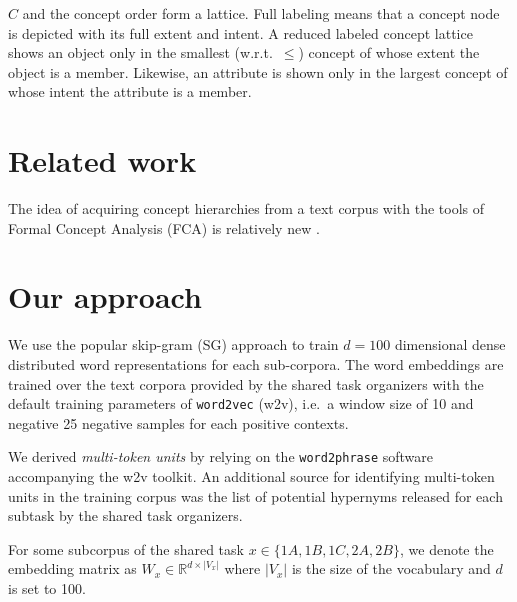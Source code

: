 \documentclass[11pt,a4paper]{article}
\begin{document}
$C$ and the concept order form a %
lattice.  
Full labeling means that a concept node is depicted with its full extent and
intent. A reduced labeled concept lattice shows an object only in the smallest
(w.r.t.~$\le$) concept of whose extent the object is a member.
Likewise, an attribute is shown only in the largest concept of whose intent the
attribute is a member.%

\section{Related work}

The idea of acquiring concept hierarchies from a text corpus with the tools of
Formal Concept Analysis (FCA) is relatively new \citep{Cimiano:2005}.

\section{Our approach}

We use the popular skip-gram (SG) %
approach \citep{Mikolov:2013f} to train $d=100$ dimensional dense distributed
word representations for each sub-corpora. The word embeddings are trained over the text corpora provided by the shared task organizers with the default training parameters of \texttt{word2vec} (w2v), i.e.~a window size of 10 and negative 25 negative samples for each positive contexts.

We derived \emph{multi-token units} by relying on the \texttt{word2phrase} software accompanying the w2v toolkit. An additional source for identifying multi-token units in the training corpus was the list of potential hypernyms released for each subtask by the shared task organizers.

For some subcorpus of the shared task $x\in\{1A, 1B, 1C, 2A, 2B\}$, we denote
the embedding matrix as $W_x \in \mathbb{R}^{d \times \lvert V_x \rvert}$ where
$\lvert V_x \rvert$ is the size of the vocabulary and $d$ is set to 100.
\end{document}
